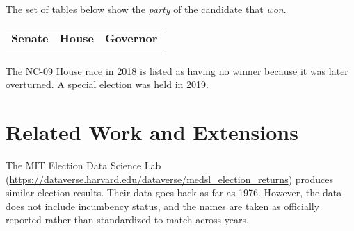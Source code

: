 \documentclass[12pt]{article}
\begin{document}
The set of tables below show the \emph{party} of the candidate that \emph{won}.

    \begin{tabularx}{\linewidth}{CCC}
    \textbf{Senate} & \textbf{House} & \textbf{Governor}\\
     &  & 
    \end{tabularx}

The NC-09 House race in 2018 is listed as having no winner because it was later overturned. A special election was held in 2019.





\section{Related Work and Extensions}

The MIT Election Data Science Lab (\url{https://dataverse.harvard.edu/dataverse/medsl\_election\_returns}) produces similar election results. Their data goes back as far as 1976. However, the data does not include incumbency status, and the names are taken as officially reported rather than standardized to match across years.
\end{document}
